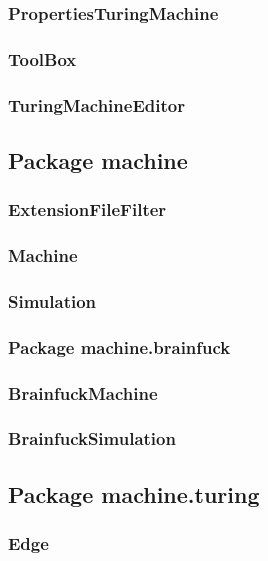 \documentclass[%
  a4paper,%
  11pt,%
  blue,%
  hyperref	%
  ]{tubsartcl}
\begin{document}
\subsubsection{PropertiesTuringMachine}

\subsubsection{ToolBox}

\subsubsection{TuringMachineEditor}


\subsection{Package machine}

\subsubsection{ExtensionFileFilter}

\subsubsection{Machine}

\subsubsection{Simulation}


\subsubsection{Package machine.brainfuck}

\subsubsection{BrainfuckMachine}

\subsubsection{BrainfuckSimulation}


\subsection{Package machine.turing}

\subsubsection{Edge}
\end{document}

